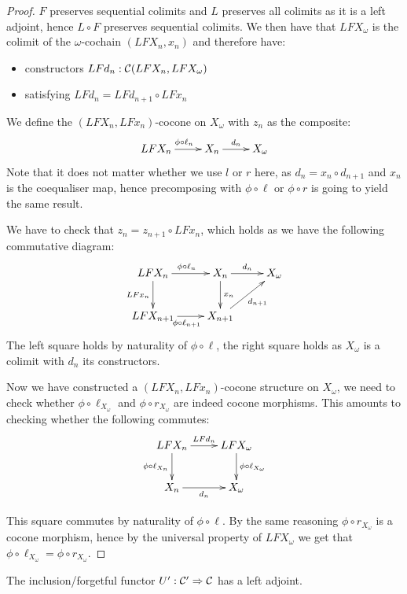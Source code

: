 \begin{proof}
  $F$ preserves sequential colimits and $L$ preserves all colimits as
  it is a left adjoint, hence $L \circ F$ preserves sequential
  colimits. We then have that $LFX_\omega$ is the colimit of the
  $\omega$-cochain $(LFX_n,x_n)$ and therefore have:
  \begin{itemize}
  \item constructors $LFd_n : \mathcal{C}(LFX_n, LFX_\omega)$
  \item satisfying $LFd_n = LFd_{n+1} \circ LFx_n$
  \end{itemize}

  We define the $(LFX_n,LFx_n)$-cocone on $X_\omega$ with $z_n$ as the
  composite:
  $$
  \xymatrix{
    LFX_n
    \ar[r]^{\phi \circ \ell_n}
    &X_n
    \ar[r]^{d_n}
    &X_\omega
  }
  $$
  Note that it does not matter whether we use $l$ or $r$ here, as
  $d_n = x_n \circ d_{n+1}$ and $x_n$ is the coequaliser map, hence
  precomposing with $\phi \circ \ell$ or $\phi \circ r$ is going to yield
  the same result.

  We have to check that $z_n = z_{n+1} \circ LFx_n$, which holds as we
  have the following commutative diagram:
  $$
  \xymatrix{
    LFX_n
    \ar[r]^{\phi \circ \ell_n}
    \ar[d]_{LF x_n}
    &X_n
    \ar[r]^{d_n}
    \ar[d]^{x_n}
    &X_\omega
    \\
    LFX_{n+1}
    \ar[r]_{\phi \circ \ell_{n+1}}
    &X_{n+1}
    \ar[ur]_{d_{n+1}}
  }
  $$
  The left square holds by naturality of $\phi \circ \ell$, the right
  square holds as $X_\omega$ is a colimit with $d_n$ its constructors.
  
  Now we have constructed a $(LFX_n,LFx_n)$-cocone structure on
  $X_\omega$, we need to check whether $\phi \circ \ell_{X_\omega}$ and
  $\phi \circ r_{X_\omega}$ are indeed cocone morphisms. This amounts
  to checking whether the following commutes:
  $$
  \xymatrix{
    LFX_n
    \ar[r]^{LF d_n}
    \ar[d]_{\phi \circ \ell_{X_n}}
    &LFX_\omega
    \ar[d]^{\phi \circ \ell_{X_\omega}}
    \\
    X_n
    \ar[r]_{d_n}
    &X_\omega
  }
  $$

  This square commutes by naturality of $\phi \circ \ell$. By the same
  reasoning $\phi \circ r_{X_\omega}$ is a cocone morphism, hence by
  the universal property of $LFX_\omega$ we get that
  $\phi \circ \ell_{X_\omega} = \phi \circ r_{X_\omega}$.
\end{proof}

\begin{proposition}
  The inclusion/forgetful functor $U' : \mathcal{C}' \Rightarrow \mathcal{C}$ has a left
  adjoint.
\end{proposition}

